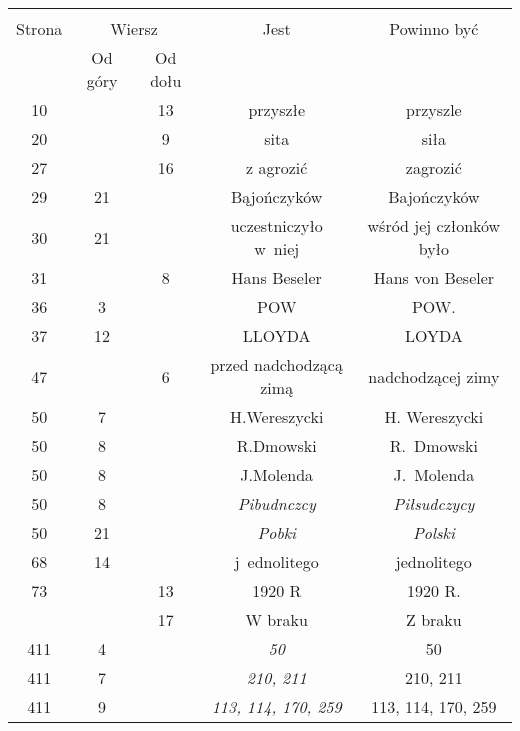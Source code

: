 \documentclass[a4paper,11pt]{article}
\numberwithin{equation}{section}
\begin{document}
\begin{center}
  \begin{tabular}{|c|c|c|c|c|}
    \hline
    & \multicolumn{2}{c|}{} & & \\
    Strona & \multicolumn{2}{c|}{Wiersz} & Jest
                              & Powinno być \\ \cline{2-3}
    & Od góry & Od dołu & & \\
    \hline
    10  & & 13 & przyszłe & przyszle \\
    20  & &  9 & sita & siła \\
    27  & & 16 & z agrozić & zagrozić \\
    29  & 21 & & Bąjończyków & Bajończyków \\
    30  & 21 & & uczestniczyło w~niej & wśród jej członków było \\
    31  & &  8 & Hans Beseler & Hans von Beseler \\
    36  &  3 & & POW & POW. \\
    37  & 12 & & LLOYDA & LOYDA \\
    47 & & 6 & przed nadchodzącą zimą & nadchodzącej zimy \\
    50  &  7 & & H.Wereszycki & H. Wereszycki \\
    50  &  8 & & R.Dmowski & R.~Dmowski \\
    50  &  8 & & J.Molenda & J.~Molenda \\
    50  &  8 & & \textit{Pibudnczcy} & \textit{Piłsudczycy} \\
    50  & 21 & & \textit{Pobki} & \textit{Polski} \\
    68  & 14 & & j~ednolitego & jednolitego \\
    73  & & 13 & 1920 R & 1920 R. \\
    & & 17 & W braku & Z braku \\
    411 &  4 & & \textit{50} & 50 \\
    411 &  7 & & \textit{210, 211} & 210, 211 \\
    411 &  9 & & \textit{113, 114, 170, 259} & 113, 114, 170, 259 \\

\end{tabular}
\end{center}
\end{document}

